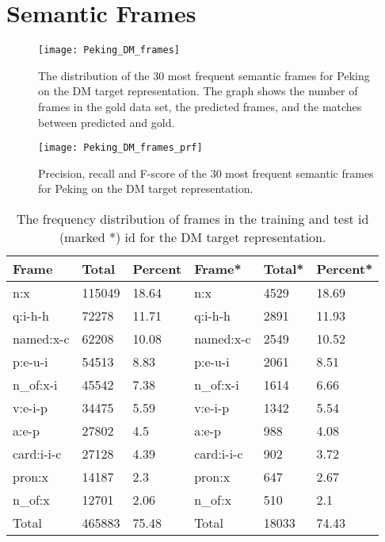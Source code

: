 \section{Semantic Frames}

\begin{figure}[h]
    \centering
    \begin{minipage}{0.8\textwidth}
        \centering
        \texttt{[image: Peking\_DM\_frames]}
    \end{minipage}
    \caption{The distribution of the 30 most frequent semantic frames for Peking on the DM target representation. The graph shows the number of frames in the gold data set, the predicted frames, and the matches between predicted and gold.}
    \label{fig:Peking_frame_30}
\end{figure}

\begin{figure}[h]
    \centering
    \begin{minipage}{0.8\textwidth}
        \centering
        \texttt{[image: Peking\_DM\_frames\_prf]}
    \end{minipage}
    \caption{Precision, recall and F-score of the 30 most frequent semantic frames for Peking on the DM target representation.}
    \label{fig:Peking_frame_prf}
\end{figure}

\begin{table}
    \centering
    \smaller[0.4]
    \begin{tabular}{@{}llllll@{}}
        \toprule
        \textbf{Frame} & \textbf{Total} & \textbf{Percent} & \textbf{Frame*} & \textbf{Total*} & \textbf{Percent*} \\
        \midrule
        n:x & 115049 & 18.64 & n:x & 4529 & 18.69 \\
        q:i-h-h & 72278 & 11.71 & q:i-h-h & 2891 & 11.93 \\
        named:x-c & 62208 & 10.08 & named:x-c & 2549 & 10.52 \\
        p:e-u-i & 54513 & 8.83 & p:e-u-i & 2061 & 8.51 \\
        n\_of:x-i & 45542 & 7.38 & n\_of:x-i & 1614 & 6.66 \\
        v:e-i-p & 34475 & 5.59 & v:e-i-p & 1342 & 5.54 \\
        a:e-p & 27802 & 4.5 & a:e-p & 988 & 4.08 \\
        card:i-i-c & 27128 & 4.39 & card:i-i-c & 902 & 3.72 \\
        pron:x & 14187 & 2.3 & pron:x & 647 & 2.67 \\
        n\_of:x & 12701 & 2.06 & n\_of:x & 510 & 2.1 \\
        \midrule
        Total & 465883 & 75.48  & Total & 18033 & 74.43 \\
        \bottomrule
    \end{tabular}
    \caption{The frequency distribution of frames in the training and test id (marked *) id for the DM target representation.}
    \label{table:dm_frames_freq}
\end{table}

